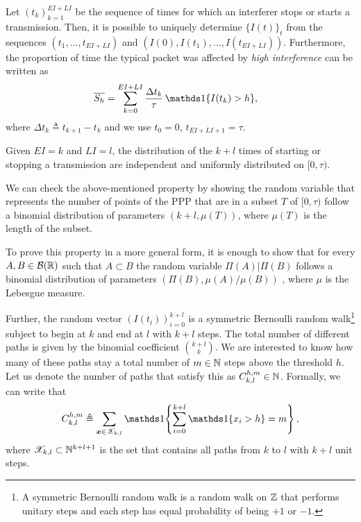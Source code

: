 Let $(t_k)_{k=1}^{EI+LI}$ be the sequence of times for which an interferer stops or starts a transmission.
%
Then, it is possible to uniquely determine $\{I(t)\}_t$ from the sequences $(t_1,\dots,t_{EI+LI})$ and $(I(0),I(t_1),\dots,I(t_{EI+LI}))$.
%
Furthermore, the proportion of time the typical packet was affected by \textit{high interference} can be written as
\begin{align} \label{eq:ch5_Sh}
    \overline{S_h}
        &= \sum_{k=0}^{EI+LI} \dfrac{\Delta t_k}{\tau}\,\ind{\{I(t_k) > h\}},
\end{align}
where $\Delta t_k \triangleq t_{k+1} - t_{k}$ and we use $t_0 = 0$, $t_{EI+LI+1} = \tau$.

Given $EI = k$ and $LI = l$, the distribution of the $k+l$ times of starting or stopping a transmission are independent and uniformly distributed on $[0,\tau)$. 
\begin{note}
    We can check the above-mentioned property by showing the random variable that represents the number of points of the PPP that are in a subset $T$ of $[0,\tau)$ follow a binomial distribution of parameters $(k+l,\mu(T))$, where $\mu(T)$ is the length of the subset.
    
    To prove this property in a more general form, it is enough to show that for every $A,B\in\mathcal{B}({\mathbb R})$ such that $A\subset B$ the random variable $\Pi(A)|\Pi(B)$ follows a binomial distribution of parameters $(\Pi(B), \mu(A)/\mu(B))$ , where $\mu$ is the Lebesgue measure.
\end{note}

Further, the random vector $(I(t_i))_{i=0}^{k+l}$ is a symmetric Bernoulli random walk\footnote{A symmetric Bernoulli random walk is a random walk on ${\mathbb Z}$ that performs unitary steps and each step has equal probability of being $+1$ or $-1$.} subject to begin at $k$ and end at $l$ with $k+l$ steps.
%
The total number of different paths is given by the binomial coefficient $\binom{k+l}{k}$.
%
We are interested to know how many of these paths stay a total number of $m\in{\mathbb N}$ steps above the threshold $h$. Let us denote the number of paths that satisfy this as $C_{k,l}^{h,m}\in{\mathbb N}$.
%
Formally, we can write that
\begin{align} \label{eq:Ch5_Cklhm}
    C_{k,l}^{h,m} \triangleq \sum_{\bm{x}\in\mathscr{X}_{k,l}}\ind
        \!\left\{ \sum_{i=0}^{k+l} \ind\{x_i > h\} = m\right\},
\end{align}
where $\mathscr{X}_{k,l} \subset {\mathbb N}^{k+l+1}$ is the set that contains all paths from $k$ to $l$ with $k+l$ unit steps.

